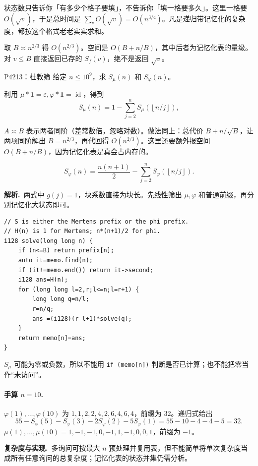 \documentclass[UTF8,a4paper,11pt,oneside,openany,fontset=fandol]{ctexbook}
\theoremstyle{definition}
\newcommand{\eps}{\varepsilon}
\newcommand{\one}{\mathbf 1}
\newcommand{\id}{\operatorname{id}}
\newcommand{\floor}[1]{\left\lfloor #1\right\rfloor}
\newcommand{\sol}{\par\noindent\textbf{解析.}\ }
\newcommand{\cost}{\par\noindent\textbf{复杂度与实现.}\ }
\begin{document}
\begin{tip}
状态数只告诉你「有多少个格子要填」，不告诉你「填一格要多久」。这里一格要 $O(\sqrt v)$，于是总时间是 $\sum_{v}O(\sqrt v)=O(n^{3/4})$。凡是递归带记忆化的复杂度，都按这个格式老老实实求和。
\end{tip}

取 $B\asymp n^{2/3}$ 得 $O(n^{2/3})$。空间是 $O(B+n/B)$，其中后者为记忆化表的量级。对 $v\le B$ 直接返回已存的 $S_f(v)$，绝不是返回 $\sqrt v$。


\begin{problem}{P4213：杜教筛}
给定 $n\le10^9$，求 $S_\mu(n)$ 和 $S_\varphi(n)$。
\end{problem}
利用 $\mu*\one=\eps,\varphi*\one=\id$，得到
\[
 S_\mu(n)=1-\sum_{j=2}^n S_\mu(\floor{n/j}),
\]

\begin{tip}[$\asymp$ 与「平衡」]
$A\asymp B$ 表示两者同阶（差常数倍，忽略对数）。做法同上：总代价 $B+n/\sqrt B$，让两项同阶解出 $B=n^{2/3}$，再代回得 $O(n^{2/3})$。这里还要额外报空间 $O(B+n/B)$，因为记忆化表是真会占内存的。
\end{tip}

\[
 S_\varphi(n)=\frac{n(n+1)}2-\sum_{j=2}^nS_\varphi(\floor{n/j}).
\]

\sol 两式中 $g(j)=1$，块系数直接为块长。先线性筛出 $\mu,\varphi$ 和普通前缀，再分别记忆化大状态即可。
\begin{lstlisting}
// S is either the Mertens prefix or the phi prefix.
// H(n) is 1 for Mertens; n*(n+1)/2 for phi.
i128 solve(long long n) {
    if (n<=B) return prefix[n];
    auto it=memo.find(n);
    if (it!=memo.end()) return it->second;
    i128 ans=H(n);
    for (long long l=2,r;l<=n;l=r+1) {
        long long q=n/l;
        r=n/q;
        ans-=(i128)(r-l+1)*solve(q);
    }
    return memo[n]=ans;
}
\end{lstlisting}
$S_\mu$ 可能为零或负数，所以不能用 \texttt{if (memo[n])} 判断是否已计算；也不能把零当作“未访问”。

\paragraph{手算 $n=10$.}
$\varphi(1),\ldots,\varphi(10)$ 为 $1,1,2,2,4,2,6,4,6,4$，前缀为 $32$。递归式给出
\[
55-S_\varphi(5)-S_\varphi(3)-2S_\varphi(2)-5S_\varphi(1)
=55-10-4-4-5=32.
\]
$\mu(1),\ldots,\mu(10)=1,-1,-1,0,-1,1,-1,0,0,1$，前缀为 $-1$。
\cost 多询问可按最大 $n$ 预处理并复用表，但不能简单将单次复杂度当成所有任意询问的总复杂度；记忆化表的状态并集仍需分析。
\end{document}
